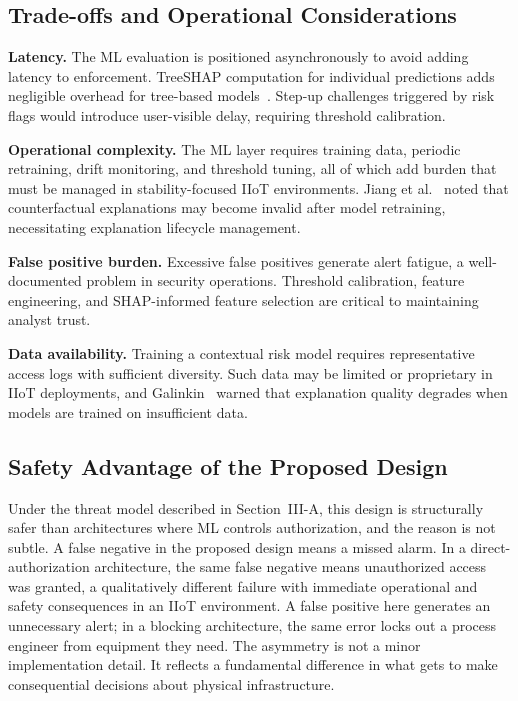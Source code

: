 \documentclass[conference]{IEEEtran}
\begin{document}
\subsection{Trade-offs and Operational Considerations}

\textbf{Latency.} The ML evaluation is positioned asynchronously to avoid adding latency to enforcement. TreeSHAP computation for individual predictions adds negligible overhead for tree-based models~\cite{lundberg2017}. Step-up challenges triggered by risk flags would introduce user-visible delay, requiring threshold calibration.

\textbf{Operational complexity.} The ML layer requires training data, periodic retraining, drift monitoring, and threshold tuning, all of which add burden that must be managed in stability-focused IIoT environments. Jiang et al.~\cite{jiang2024} noted that counterfactual explanations may become invalid after model retraining, necessitating explanation lifecycle management.

\textbf{False positive burden.} Excessive false positives generate alert fatigue, a well-documented problem in security operations. Threshold calibration, feature engineering, and SHAP-informed feature selection are critical to maintaining analyst trust.

\textbf{Data availability.} Training a contextual risk model requires representative access logs with sufficient diversity. Such data may be limited or proprietary in IIoT deployments, and Galinkin~\cite{galinkin2022} warned that explanation quality degrades when models are trained on insufficient data.

\subsection{Safety Advantage of the Proposed Design}

Under the threat model described in Section~III-A, this design is structurally safer than architectures where ML controls authorization, and the reason is not subtle. A false negative in the proposed design means a missed alarm. In a direct-authorization architecture, the same false negative means unauthorized access was granted, a qualitatively different failure with immediate operational and safety consequences in an IIoT environment. A false positive here generates an unnecessary alert; in a blocking architecture, the same error locks out a process engineer from equipment they need. The asymmetry is not a minor implementation detail. It reflects a fundamental difference in what gets to make consequential decisions about physical infrastructure.
\end{document}
